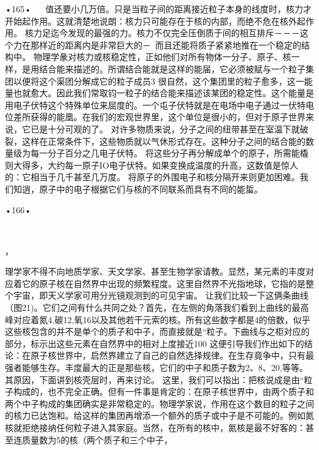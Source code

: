 •165•
  
值还要小几万倍。只是当粒子间的距离接近粒子本身的线度时，核力才开始起作用。这就清楚地说朗：核力只可能存在于核的内部，而绝不危在核外起作用。
核力足迄今发现的最强的力。核力不仅完全压倒质于间的相互排斥－－－这个力在那样近的距离内是非常巨大的－~而且还能将质子紧紧地推在一个稳定的结构中。
物理学彖对核力或核稳定性，正如他们对所有物体一分子、原子、核一样，是用结合能来描述的。所谓结合能就是这样的能届，它必须被赋与一个粒子集团以便将这个渠团分解成它的粒子成员3
很自然，这个集团里的粒子愈多，这一能量也就愈大。因此我们常取钧一粒子的结合能来描述该某团的稳定性。这个能量是用电子伏特这个特殊单位来屈度的。一个屯子伏特就是在电场中电子通过一伏特电位差所获得的能凰。在我们的宏观世界里，这个单位是很小的，但对于原子世界来说，它已是十分可观的了。
对许多物质来说，分子之间的纽带甚至在室温下就破裂，这样在正常条件下，这些物质就以气休形式存在。这种分子之间的结合能的数量级为每一分子百分之几电子伏特。
将这些分子再分解成单个的原子，所需能橇则大得多，大约每一原子IO电子伏特。如果变换成温度的升高，这数值是惊人的：它相当于几千甚至几万度。
将原子的外围电子和核分隔开来则更加困难。我们知逍，原子中的电子根据它们与核的不同联系而具有不同的能蜇。

•166•
  








  

，
 
理学家不得不向地质学家、天文学家、甚至生物学家请教。显然，某元素的丰度对应着它的原子核在自然界中出现的频繁程度。这里自然界不光指地球，它指的是整个宇宙，即天义学家可用分光镜观测到的可见宇宙。
让我们比较一下这俩条曲线（图21)。它们之间有什么共同之处？首先，在左侧的角落我们看到上曲线的最高峰对应着氮4,碳12,氧16以及其他若干元索的核。所有这些数字都是4的倍数，似乎这些核包含的并不是单个的质子和中子，而直接就是“粒子。下曲线与之柜对应的部分，标示出这些元素在自然界中的相对上度接近100%
这便引导我们作出如下的结论：在原子核世界中，启然界建立了自己的自然选择规律。在生存竟争中，只有最强者能够生存。丰度最大的正是那些核，它们的中子和质子数为2、8、20,等等。其原因，下面讲到核壳层时，再来讨论。
这里，我们可以指出：把核说成是由“粒子构成的，也不完全正确。但有一件事是肯定的：在原子核世界中，由两个质子和两个中子构成的集团确实是非常稳定的。物理学家说，作用在这个数目的粒子之间的核力已达饱和。给这样的集团再增添一个额外的质子或中子是不可能的。例如氮核就拒绝接纳任何粒子进入其家庭。当然，在所有的核中，氮核是最不好客的：甚至连质量数为5的核（两个质子和三个中子，

